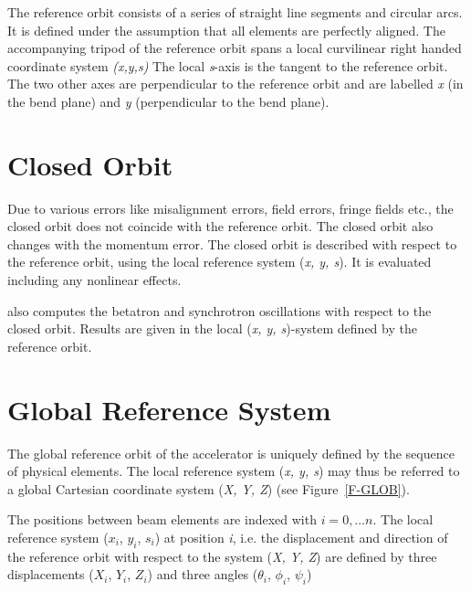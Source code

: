 The reference orbit consists of a series of straight line segments and
circular arcs. It is defined under the assumption that all elements are
perfectly aligned. The accompanying tripod of the reference orbit spans
a local curvilinear right handed coordinate system {\it (x,y,s)} The
local {\it s}-axis is the tangent to the reference orbit. The two
other axes are perpendicular to the reference orbit and are labelled
{\it x} (in the bend plane) and {\it y} (perpendicular to the bend
plane).  


\section{Closed Orbit}
\label{sec:closed_orbit}

Due to various errors like misalignment errors, field errors, fringe
fields etc., the closed orbit does not coincide with the reference
orbit. The closed orbit also changes with the momentum error. 
The closed orbit is described with respect to the reference orbit, using
the local reference system ({\it x, y, s}). It is evaluated including
any nonlinear effects.  

\madx also computes the betatron and synchrotron oscillations with respect
to the closed orbit. Results are given in the local ({\it x, y,
  s})-system defined by the reference orbit. 



\section{Global Reference System}
\label{sec:global_ref}

The global reference orbit of the accelerator is
uniquely defined by the sequence of physical elements. The local
reference system ({\it x, y, s}) may thus be
referred to a global Cartesian coordinate system ({\it X, Y, Z}) 
(see Figure~\ref{F-GLOB}). 

The positions between beam elements are indexed with $i=0,\ldots n$. 
The local reference system  ({$x_i$, $y_i$, $s_i$}) at position
{\it i}, i.e. the displacement and direction of the reference orbit
with respect to the system ({\it X, Y, Z}) are
defined by three displacements  ($X_i$, $Y_i$, $Z_i$) and three angles
($\theta_i$, $\phi_i$, $\psi_i$) 

